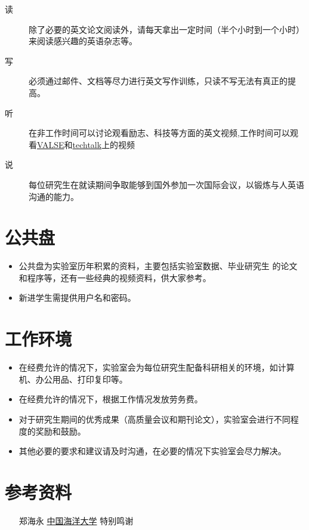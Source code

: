 \documentclass[a4paper，12pt]{article}
\begin{document}
\begin{description}

\item[读] 除了必要的英文论文阅读外，请每天拿出一定时间（半个小时到一个小时）来阅读感兴趣的英语杂志等。

\item[写] 必须通过邮件、文档等尽力进行英文写作训练，只读不写无法有真正的提高。

\item[听] 在非工作时间可以讨论观看励志、科技等方面的英文视频,工作时间可以观看\href{http://vision.ouc.edu.cn/valse/}{VALSE}和\href{http://techtalks.tv/}{techtalk}上的视频

\item[说] 每位研究生在就读期间争取能够到国外参加一次国际会议，以锻炼与人英语沟通的能力。

\end{description}

\section{公共盘}

\begin{itemize}

\item 公共盘为实验室历年积累的资料，主要包括实验室数据、毕业研究生
的论文和程序等，还有一些经典的视频资料，供大家参考。

\item 新进学生需提供用户名和密码。

\end{itemize}

\section{工作环境}

\begin{itemize}

\item 在经费允许的情况下，实验室会为每位研究生配备科研相关的环境，如计算机、办公用品、打印复印等。

\item  在经费允许的情况下，根据工作情况发放劳务费。

\item 对于研究生期间的优秀成果（高质量会议和期刊论文），实验室会进行不同程度的奖励和鼓励。

\item 其他必要的要求和建议请及时沟通，在必要的情况下实验室会尽力解决。

\end{itemize}

\section{参考资料}

\begin{itemize}
\item[郑海永]\href{http://vision.ouc.edu.cn/~zhenghaiyong/}{中国海洋大学} 特别鸣谢
\end{itemize}
\end{document}
